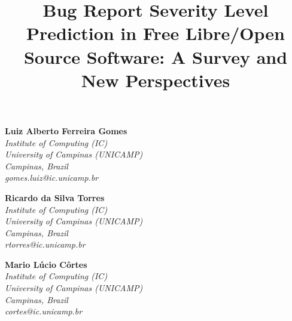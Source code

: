 \documentclass[journal, onecolumn]{IEEEtran}
\begin{document}
\title{
  Bug Report Severity Level Prediction in Free Libre/Open Source Software: A Survey and New Perspectives
}




\maketitle

\begin{minipage}[t]{0.3\textwidth}
	\centering
	\textbf{Luiz Alberto Ferreira Gomes}\\
    \textit{Institute of Computing (IC)\\ University of Campinas (UNICAMP)\\Campinas, Brazil\\
	gomes.luiz@ic.unicamp.br}
\end{minipage}
\begin{minipage}[t]{0.3\textwidth}
	\centering
	\textbf{Ricardo da Silva Torres}\\
    \textit{Institute of Computing (IC)\\ University of Campinas (UNICAMP)\\Campinas, Brazil\\
	rtorres@ic.unicamp.br}
\end{minipage}
\begin{minipage}[t]{0.3\textwidth}
	\centering
	\textbf{Mario Lúcio Côrtes}\\
    \textit{Institute of Computing (IC)\\ University of Campinas (UNICAMP)\\Campinas, Brazil\\
	cortes@ic.unicamp.br}
\end{minipage}
\vspace{1cm}



\begin{IEEEkeywords}
  
\end{IEEEkeywords}

\IEEEpeerreviewmaketitle
  
  
  
  
  
  
  
  
  
%  
\end{document}
